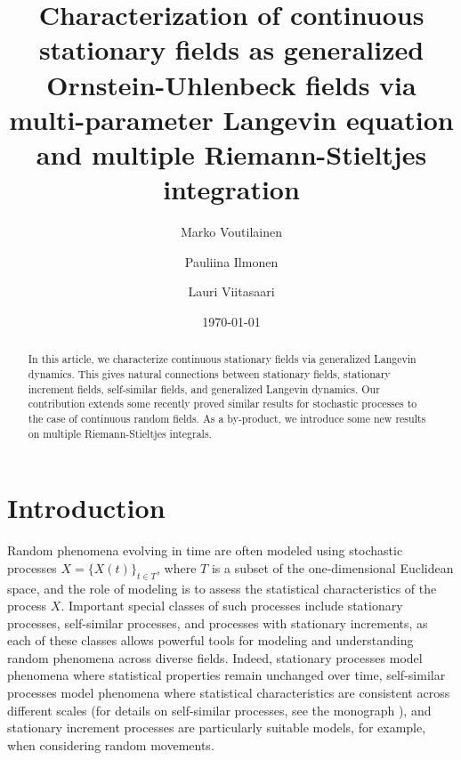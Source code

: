 \documentclass[english, a4paper, 12pt,reqno]{amsart}
\begin{document}
\title[Characterization of continuous stationary fields]{Characterization of continuous stationary fields as generalized Ornstein-Uhlenbeck fields via multi-parameter Langevin equation and multiple Riemann-Stieltjes integration}


	\author[Voutilainen]{Marko Voutilainen}
	\address{Marko Voutilainen,
		Department of Accounting and Finance,
		University of Turku,
		20014 Turun yliopisto,
		Finland}
	\author[Ilmonen]{Pauliina Ilmonen}
	\address{Pauliina Ilmonen,
		Department of Mathematics and Systems Analysis,
		Aalto University School of Science,
		00076 Aalto,
		Finland}
	\author[Viitasaari]{Lauri Viitasaari}
	\address{Lauri Viitasaari,
		Department of Information and Service Management, Aalto University School of Business, 00076 Aalto, Finland}
		
		
		\date{\today}
		
		\begin{abstract}
			In this article, we characterize continuous stationary fields via generalized Langevin dynamics. This gives natural connections between stationary fields, stationary increment fields, self-similar fields, and generalized Langevin dynamics. Our contribution extends some recently proved similar results for stochastic processes to the case of continuous random fields. As a by-product, we introduce some new results on multiple Riemann-Stieltjes integrals.
		
		\end{abstract}


\maketitle

    

\section{Introduction}
Random phenomena evolving in time are often modeled using stochastic processes $X=\{X(t)\}_{t\in T}$, where $T$ is a subset of the one-dimensional Euclidean space, and the role of modeling is to assess the statistical characteristics of the process $X$. Important special classes of such processes include stationary processes, self-similar processes, and processes with stationary increments, as each of these classes allows powerful tools for modeling and understanding random phenomena across diverse fields. Indeed, stationary processes model phenomena where statistical properties remain unchanged over time, self-similar processes model phenomena where statistical characteristics are consistent across different scales (for details on self-similar processes, see the monograph \cite{embrechts2002selfsimilar}), and stationary increment processes are particularly suitable models, for example, when considering random movements.
\end{document}
